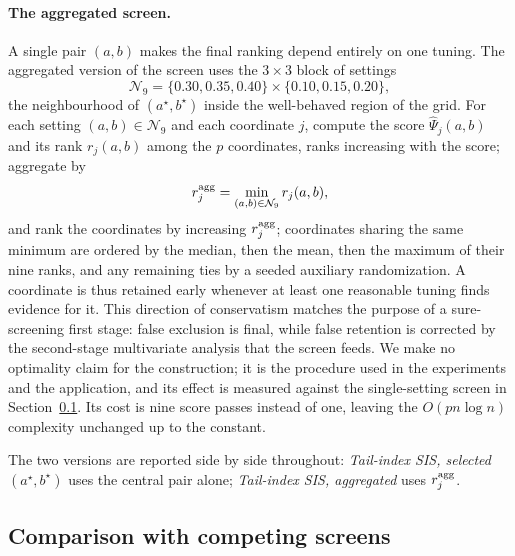 \paragraph{The aggregated screen.}
A single pair $(a,b)$ makes the final ranking depend entirely on one
tuning. The aggregated version of the screen uses the $3\times3$ block
of settings
\[
 \mathcal N_9=\{0.30,0.35,0.40\}\times\{0.10,0.15,0.20\},
\]
the neighbourhood of $(a^\star,b^\star)$ inside the well-behaved region
of the grid. For each setting $(a,b)\in\mathcal N_9$ and each
coordinate $j$, compute the score $\widehat\Psi_j(a,b)$ and its rank
$r_j(a,b)$ among the $p$ coordinates, ranks increasing with the score;
aggregate by
\[
 r_j^{\rm agg}=\min_{(a,b)\in\mathcal N_9}r_j(a,b),
\]
and rank the coordinates by increasing $r_j^{\rm agg}$; coordinates
sharing the same minimum are ordered by the median, then the mean, then
the maximum of their nine ranks, and any remaining ties by a seeded
auxiliary randomization. A coordinate is thus retained early whenever at least
one reasonable tuning finds evidence for it. This direction of
conservatism matches the purpose of a sure-screening first stage: false
exclusion is final, while false retention is corrected by the
second-stage multivariate analysis that the screen feeds. We make no
optimality claim for the construction; it is the procedure used in the
experiments and the application, and its effect is measured against the
single-setting screen in Section~\ref{sec:comparison}. Its cost is nine
score passes instead of one, leaving the $O(pn\log n)$ complexity
unchanged up to the constant.

The two versions are reported side by side throughout:
\emph{Tail-index SIS, selected $(a^\star,b^\star)$} uses the central
pair alone; \emph{Tail-index SIS, aggregated} uses $r_j^{\rm agg}$.

\subsection{Comparison with competing screens}\label{sec:comparison}

